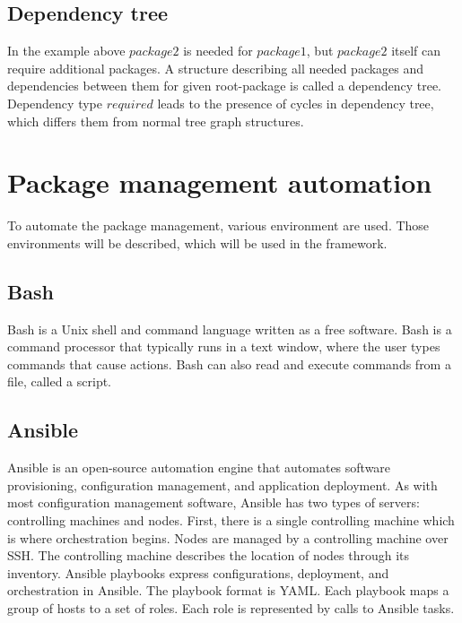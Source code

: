\subsection*{Dependency tree}
In the example above $package2$ is needed for $package1$, but $package2$ itself can require additional packages.
A structure describing all needed packages and dependencies between them for given root-package is called a dependency tree. 
Dependency type $required$ leads to the presence of cycles in dependency tree, which differs them from normal tree graph structures.

\section{Package management automation}
To automate the package management, various environment are used. 
Those environments will be described, which will be used in the framework.
\subsection{Bash} \label{lang:bash}
Bash is a Unix shell and command language written as a free software.
Bash is a command processor that typically runs in a text window, where the user types commands that cause actions.
Bash can also read and execute commands from a file, called a script. \cite{bash}
\subsection{Ansible} \label{lang:ansible}
Ansible is an open-source automation engine that automates software provisioning, configuration management, and application deployment.
As with most configuration management software, Ansible has two types of servers: controlling machines and nodes.
First, there is a single controlling machine which is where orchestration begins.
Nodes are managed by a controlling machine over SSH.
The controlling machine describes the location of nodes through its inventory.
Ansible playbooks express configurations, deployment, and orchestration in Ansible.
The playbook format is YAML. 
Each playbook maps a group of hosts to a set of roles.
Each role is represented by calls to Ansible tasks.
 \cite{ansible} 
